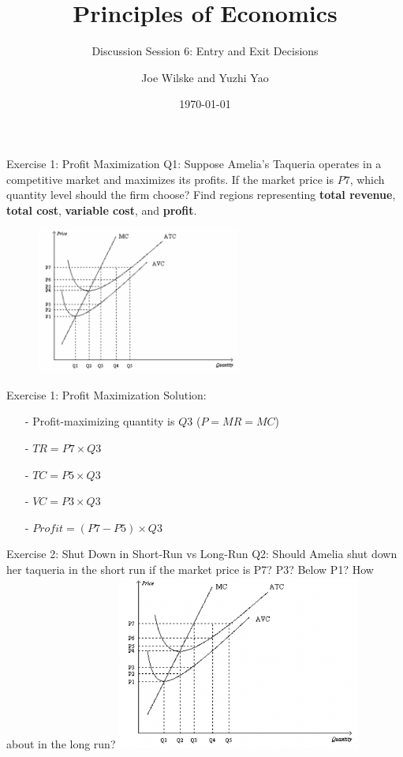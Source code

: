 \documentclass[9pt, handout]{beamer}
\title{Principles of Economics}
\subtitle{Discussion Session 6: Entry and Exit Decisions}
\author{Joe Wilske and Yuzhi Yao}
\institute{Boston College}
\date{\today}
\begin{document}
\frame{\titlepage}

\begin{frame}{Exercise 1: Profit Maximization}
    Q1: Suppose Amelia's Taqueria operates in a competitive market and maximizes its profits. If the market price is $P7$, which quantity level should the firm choose? Find regions representing \textbf{total revenue}, \textbf{total cost}, \textbf{variable cost}, and \textbf{profit}. 
    \begin{figure}
        \includegraphics[width=0.6\textwidth, left]{fig1.png}
    \end{figure}
\end{frame}

\begin{frame}{Exercise 1: Profit Maximization}
    Solution: 
    \begin{itemize}
        \item[-] Profit-maximizing quantity is $Q3$ ($P=MR=MC$)
        \item[-] $TR =P7\times Q3$
        \item[-] $TC =P5\times Q3$
        \item[-] $VC =P3\times Q3$
        \item[-] $Profit = (P7-P5)\times Q3$
    \end{itemize}
    \vspace{1.5in}
\end{frame}

\begin{frame}{Exercise 2: Shut Down in Short-Run vs Long-Run}
    Q2: Should Amelia shut down her taqueria in the short run if the market price is P7? P3? Below P1? How about in the long run?
    \vspace{0.1in}
    \includegraphics[width=0.6\textwidth, left]{fig1.png}
\end{frame}
\end{document}
